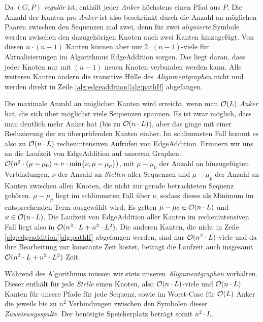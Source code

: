 \begin{beweis}
	Da $(G,P)$ \emph{regulär} ist, enthält jeder \emph{Anker} höchstens einen Pfad aus $P$. Die Anzahl der Kanten pro \emph{Anker} ist also beschränkt durch die Anzahl an möglichen Paaren zwischen den Sequenzen mal zwei, denn für zwei \emph{alignierte} Symbole werden zwischen den dazugehörigen Knoten auch zwei Kanten hinzugefügt. Von diesen $n\cdot (n-1)$ Kanten können aber nur $2\cdot (n-1)$-viele für Aktualisierungen im Algorithmus \textrm{EdgeAddition} sorgen. Das liegt daran, dass jeder Knoten nur mit $(n-1)$ neuen Knoten verbunden werden kann. Alle weiteren Kanten ändern die transitive Hülle des \emph{Alignmentgraphen} nicht und werden direkt in Zeile \ref{alg:edgeaddition}\ref{alg:pathIf} abgefangen.
	
	Die maximale Anzahl an möglichen Kanten wird erreicht, wenn man $\mathcal{O}(L)$ \emph{Anker} hat, die sich über möglichst viele Sequenzen spannen. Es ist zwar möglich, dass man deutlich mehr Anker hat (bis zu $\mathcal{O}(n\cdot L)$), aber das ginge mit einer Reduzierung der zu überprüfenden Kanten einher. Im schlimmsten Fall kommt es also zu $\mathcal{O}(n\cdot L)$ rechenintensiven Aufrufen von \textrm{EdgeAddition}. Erinnern wir uns an die Laufzeit von \textrm{EdgeAddition} auf unserem Graphen: $\mathcal{O}(n^2 \cdot (\mu - \mu_0) + \nu \cdot \min\{\nu, \mu - \mu_p\})$, mit $\mu - \mu_0$ der Anzahl an hinzugefügten Verbindungen, $\nu$ der Anzahl an \emph{Stellen} aller Sequenzen und $\mu - \mu_p$ der Anzahl an Kanten zwischen allen Knoten, die nicht zur gerade betrachteten Sequenz gehören. $\mu - \mu_p$ liegt im schlimmsten Fall über $\nu$, sodass dieses als Minimum im entsprechenden Term ausgewählt wird. Es gelten $\mu - \mu_0 \in \mathcal{O}(n\cdot L)$ und $\nu \in \mathcal{O}(n\cdot L)$. Die Laufzeit von \textrm{EdgeAddition} aller Kanten im rechenintensiven Fall liegt also in $\mathcal{O}(n^3\cdot L + n^2\cdot L^2)$. Die anderen Kanten, die nicht in Zeile \ref{alg:edgeaddition}\ref{alg:pathIf} abgefangen werden, sind nur $\mathcal{O}(n^2\cdot L)$-viele und da ihre Bearbeitung nur konstante Zeit kostet, beträgt die Laufzeit auch insgesamt $\mathcal{O}(n^3\cdot L + n^2\cdot L^2)$ Zeit.
	
	Während des Algorithmus müssen wir stets unseren \emph{Alignmentgraphen} vorhalten. Dieser enthält für jede \emph{Stelle} einen Knoten, also $\mathcal{O}(n\cdot L)$-viele und $\mathcal{O}(n\cdot L)$ Kanten für unsere Pfade für jede Sequenz, sowie im Worst-Case für $\mathcal{O}(L)$ Anker die jeweils bis zu $n^2$ Verbindungen zwischen den Symbolen dieser \emph{Zuweisungsspalte}. Der benötigte Speicherplatz beträgt somit $n^2\cdot L$.  
\end{beweis}

